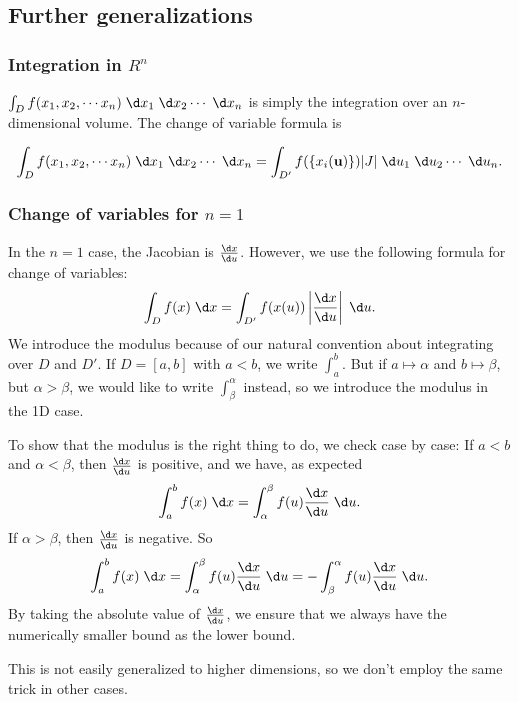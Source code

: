 \documentclass[a4paper]{article}
\begin{document}
\subsection{Further generalizations}
\subsubsection*{Integration in \texorpdfstring{$R^n$}{Rn}}
$\int_D f(x_1, x_2, \cdots x_n)\;\d x_1 \;\d x_2\cdots\;\d x_n$ is simply the integration over an $n$-dimensional volume. The change of variable formula is
\begin{prop}
  \[
    \int_D f(x_1, x_2, \cdots x_n)\;\d x_1 \;\d x_2\cdots\;\d x_n = \int_{D'} f(\{x_i(\mathbf{u})\}) |J| \;\d u_1\;\d u_2\cdots\;\d u_n.
  \]
\end{prop}

\subsubsection*{Change of variables for \texorpdfstring{$n = 1$}{n = 1}}
In the $n = 1$ case, the Jacobian is $\frac{\d x}{\d u}$. However, we use the following formula for change of variables:
\[
  \int_D f(x) \;\d x = \int_{D'} f(x(u))\left|\frac{\d x}{\d u}\right| \;\d u.
\]
We introduce the modulus because of our natural convention about integrating over $D$ and $D'$. If $D = [a, b]$ with $a < b$, we write $\int_a^b$. But if $a\mapsto \alpha$ and $b \mapsto \beta$, but $\alpha > \beta$, we would like to write $\int_\beta ^\alpha$ instead, so we introduce the modulus in the 1D case.

To show that the modulus is the right thing to do, we check case by case: If $a < b$ and $\alpha < \beta$, then $\frac{\d x}{\d u}$ is positive, and we have, as expected
\[
  \int_a^b f(x)\;\d x = \int_\alpha^\beta f(u)\frac{\d x}{\d u}\;\d u.
\]
If $\alpha > \beta$, then $\frac{\d x}{\d u}$ is negative. So
\[
  \int_a^b f(x)\;\d x = \int_\alpha^\beta f(u)\frac{\d x}{\d u}\;\d u = -\int_\beta^\alpha f(u)\frac{\d x}{\d u}\;\d u.
\]
By taking the absolute value of $\frac{\d x}{\d u}$, we ensure that we always have the numerically smaller bound as the lower bound.

This is not easily generalized to higher dimensions, so we don't employ the same trick in other cases.
\end{document}
